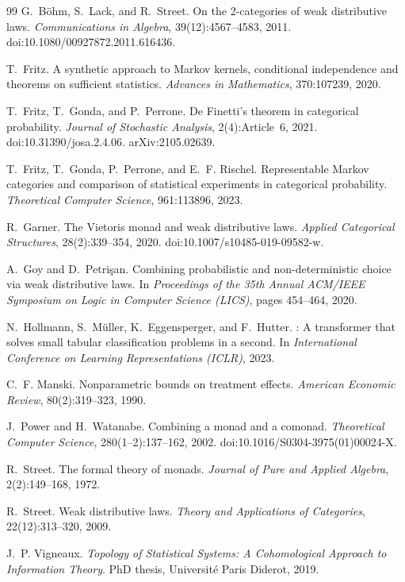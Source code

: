 \documentclass[11pt]{article}
\theoremstyle{definition}
\theoremstyle{remark}
\begin{document}
\begin{thebibliography}{99}
G.~B\"ohm, S.~Lack, and R.~Street.
\newblock On the 2-categories of weak distributive laws.
\newblock \emph{Communications in Algebra}, 39(12):4567--4583, 2011.
\newblock doi:10.1080/00927872.2011.616436.

T.~Fritz.
\newblock A synthetic approach to {M}arkov kernels, conditional independence and theorems on
  sufficient statistics.
\newblock \emph{Advances in Mathematics}, 370:107239, 2020.

T.~Fritz, T.~Gonda, and P.~Perrone.
\newblock De {F}inetti's theorem in categorical probability.
\newblock \emph{Journal of Stochastic Analysis}, 2(4):Article~6, 2021.
\newblock doi:10.31390/josa.2.4.06. arXiv:2105.02639.

T.~Fritz, T.~Gonda, P.~Perrone, and E.~F. Rischel.
\newblock Representable {M}arkov categories and comparison of statistical experiments in categorical
  probability.
\newblock \emph{Theoretical Computer Science}, 961:113896, 2023.

R.~Garner.
\newblock The {V}ietoris monad and weak distributive laws.
\newblock \emph{Applied Categorical Structures}, 28(2):339--354, 2020.
\newblock doi:10.1007/s10485-019-09582-w.

A.~Goy and D.~Petri\c{s}an.
\newblock Combining probabilistic and non-deterministic choice via weak distributive laws.
\newblock In \emph{Proceedings of the 35th Annual ACM/IEEE Symposium on Logic in Computer Science
  (LICS)}, pages 454--464, 2020.

N.~Hollmann, S.~M\"uller, K.~Eggensperger, and F.~Hutter.
: A transformer that solves small tabular classification problems in a second.
\newblock In \emph{International Conference on Learning Representations (ICLR)}, 2023.

C.~F. Manski.
\newblock Nonparametric bounds on treatment effects.
\newblock \emph{American Economic Review}, 80(2):319--323, 1990.

J.~Power and H.~Watanabe.
\newblock Combining a monad and a comonad.
\newblock \emph{Theoretical Computer Science}, 280(1--2):137--162, 2002.
\newblock doi:10.1016/S0304-3975(01)00024-X.

R.~Street.
\newblock The formal theory of monads.
\newblock \emph{Journal of Pure and Applied Algebra}, 2(2):149--168, 1972.

R.~Street.
\newblock Weak distributive laws.
\newblock \emph{Theory and Applications of Categories}, 22(12):313--320, 2009.

J.~P. Vigneaux.
\newblock \emph{Topology of Statistical Systems: A Cohomological Approach to Information Theory}.
\newblock PhD thesis, Universit\'e Paris Diderot, 2019.

\end{thebibliography}
\end{document}
